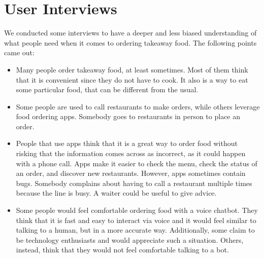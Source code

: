 \section{User Interviews}

We conducted some interviews to have a deeper and less biased understanding of
what people need when it comes to ordering takeaway food. The following
points came out:

\begin{itemize}
    \item Many people order takeaway food, at least sometimes. Most of them think
    that it is convenient since they do not have to cook. It also is a way to
    eat some particular food, that can be different from the usual.
    \item Some people are used to call restaurants to make orders, while others
    leverage food ordering apps. Somebody goes to restaurants in person to place
    an order.
    \item People that use apps think that it is a great way to order food without
    risking that the information comes across as incorrect, as it could happen
    with a phone call. Apps make it easier to check the menu, check the status
    of an order, and discover new restaurants. However, apps sometimes contain
    bugs. Somebody complains about having to call a restaurant multiple
    times because the line is busy. A waiter could be useful to give advice.
    \item Some people would feel comfortable ordering food with a voice chatbot.
    They think that it is fast and easy to interact via voice and it would feel
    similar to talking to a human, but in a more accurate way. Additionally, some
    claim to be technology enthusiasts and would appreciate such a situation.
    Others, instead,
    think that they would not feel comfortable talking to a bot.

\end{itemize}